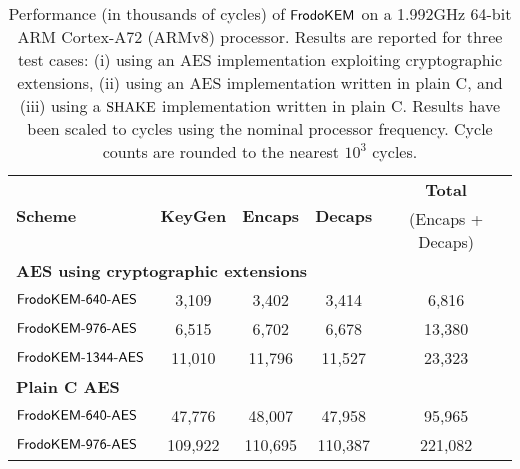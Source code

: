 \begin{table}[t]
\caption{Performance (in thousands of cycles) of $\textsf{\upshape\mdseries FrodoKEM}$ on a 1.992GHz 64-bit ARM Cortex-A72 (ARMv8) processor. Results are reported for three test cases: (i) using an AES implementation exploiting cryptographic extensions, (ii) using an AES implementation written in plain C, and (iii) using a $\textrm{\upshape\mdseries SHAKE}$ implementation written in plain C. Results have been scaled to cycles using the nominal processor frequency. Cycle counts are rounded to the nearest $10^3$ cycles.}\label{tab:results_arm}
\medskip
\centering
\renewcommand{\tabcolsep}{0.25cm}
\renewcommand{\arraystretch}{1.1}
\begin{tabular}{l|c c c|c}
\toprule
\multirow{2}{*}{\textbf{Scheme}}     &     \multirow{2}{*}{\textbf{KeyGen}}      &    \multirow{2}{*}{\textbf{Encaps}}   &    \multirow{2}{*}{\textbf{Decaps}}   &    \textbf{Total}        \\ 
                                                       &                                                            &                                                         &                                                       &    (Encaps + Decaps)   \\
\midrule
\multicolumn{5}{l}{\bf AES using cryptographic extensions} \\
\midrule
$\textsf{\upshape\mdseries FrodoKEM-640-AES}$                               &            3,109                &            3,402                   &                 3,414         &                6,816             \\
$\textsf{\upshape\mdseries FrodoKEM-976-AES}$                             &            6,515                &            6,702                   &                6,678       &                13,380             \\
$\textsf{\upshape\mdseries FrodoKEM-1344-AES}$                             &            11,010                &            11,796                   &                11,527       &                23,323             \\
\midrule
\multicolumn{5}{l}{\bf Plain C AES} \\
\midrule
$\textsf{\upshape\mdseries FrodoKEM-640-AES}$                               &            47,776                &           48,007                   &               47,958       &              95,965             \\
$\textsf{\upshape\mdseries FrodoKEM-976-AES}$                             &         109,922                &         110,695                   &             110,387       &               221,082             \\

\end{tabular}
\end{table}
